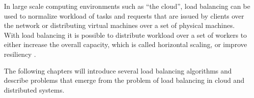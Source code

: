 In large scale computing environments such as ``the cloud'', load balancing can
be used to normalize workload of tasks and requests that are issued by
clients over the network \cite{alakeel2010guide} or distributing virtual machines
over a set of physical machines.
With load balancing it is possible to distribute workload over a set of workers
to either increase the overall capacity, which is called horizontal scaling,
or improve resiliency \cite{areYouLoadBalancingWrong}.

The following chapters will introduce several load balancing algorithms and
describe problems that emerge from the problem of load balancing in cloud and
distributed systems.

